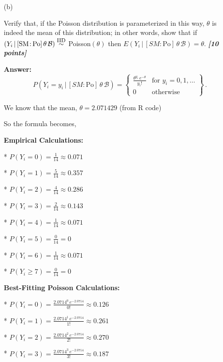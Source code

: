 \documentclass[12pt]{article}
\newcommand{\given}{\, | \,}
\newcommand{\bi}[1]{\b{\i{#1}}}
\renewcommand{\b}[1]{\textbf{#1}}
\renewcommand{\i}[1]{\textit{#1}}
\renewcommand{\r}[1]{\text{#1}}
\begin{document}
\begin{itemize}

\item[(b)]

Verify that, if the Poisson distribution is parameterized in this way, $\theta$ is indeed the mean of this distribution; in other words, show that if $( Y_i \given [ \textrm{SM} \colon \! \r{Po} ] \, \theta \, \mathcal{ B } ) \stackrel{ \textrm{\footnotesize IID} }{ \sim }$ Poisson$( \theta )$ then $E ( Y_i \given [ SM \colon \! \r{Po} ] \, \theta \, \mathcal{ B } ) = \theta$. \bi{[10 points]}



{\color{blue} \textbf{Answer:}
\begin{equation}
P ( Y_i = y_i \given [ SM \colon \! \r{Po} ] \, \theta \, \mathcal{ B } ) = \left\{ \begin{array}{cc} \frac{ \theta^{ y_i } \, e^{ - \theta } }{ y_i ! } & \textrm{for } y_i = 0, 1, \dots \\ 0 & \textrm{otherwise} \end{array} \right\} \, .
\end{equation}

We know that the mean, $\theta = 2.071429$ (from R code)

So the formula becomes,

\textbf{Empirical Calculations:}

* $P(Y_i = 0) = \frac{1}{14} \approx 0.071$

* $P(Y_i = 1) = \frac{5}{14} \approx 0.357$

* $P(Y_i = 2) = \frac{4}{14} \approx 0.286$

* $P(Y_i = 3) = \frac{2}{14} \approx 0.143$

* $P(Y_i = 4) = \frac{1}{14} \approx 0.071$

* $P(Y_i = 5) = \frac{0}{14} = 0$

* $P(Y_i = 6) = \frac{1}{14} \approx 0.071$

* $P(Y_i \ge 7) = \frac{0}{14} = 0$

\textbf{Best-Fitting Poisson Calculations:}

* $P(Y_i = 0) = \frac{ 2.0714^{ 0 } \, e^{ - 2.0714 } }{ 0 ! }  \approx 0.126$

* $P(Y_i = 1) = \frac{ 2.0714^{ 1 } \, e^{ - 2.0714 } }{ 1 ! }  \approx 0.261$

* $P(Y_i = 2) = \frac{ 2.0714^{ 2 } \, e^{ - 2.0714 } }{ 2 ! }  \approx 0.270$

* $P(Y_i = 3) = \frac{ 2.0714^{ 3 } \, e^{ - 2.0714 } }{ 3 ! }  \approx 0.187$

}
\end{itemize}
\end{document}
